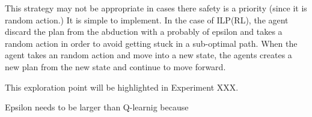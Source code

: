 This strategy may not be appropriate in cases there safety is a priority (since it is random action.)
It is simple to implement. 
In the case of ILP(RL), the agent discard the plan from the abduction with a probably of epsilon and takes a random action in order to avoid getting stuck in a sub-optimal path. 
When the agent takes an random action and move into a new state, the agents creates a new plan from the new state and continue to move forward.

This exploration point will be highlighted in Experiment XXX.

Epsilon needs to be larger than Q-learnig because